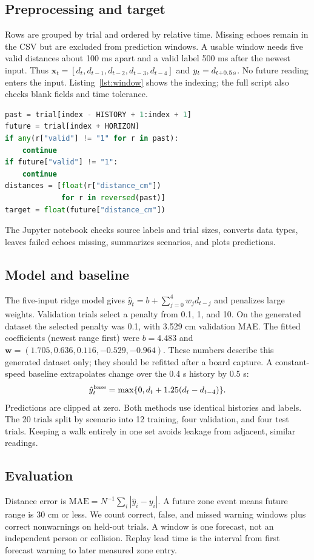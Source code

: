 \documentclass[conference]{IEEEtran}
\begin{document}
\subsection{Preprocessing and target}
Rows are grouped by trial and ordered by relative time. Missing echoes remain in the CSV but are excluded from prediction windows. A usable window needs five valid distances about 100 ms apart and a valid label 500 ms after the newest input. Thus $\mathbf{x}_t=[d_t,d_{t-1},d_{t-2},d_{t-3},d_{t-4}]$ and $y_t=d_{t+0.5\,{\rm s}}$. No future reading enters the input. Listing~\ref{lst:window} shows the indexing; the full script also checks blank fields and time tolerance.
\begin{lstlisting}[language=Python,caption={Condensed history construction from train_model.py.},label={lst:window}]
past = trial[index - HISTORY + 1:index + 1]
future = trial[index + HORIZON]
if any(r["valid"] != "1" for r in past):
    continue
if future["valid"] != "1":
    continue
distances = [float(r["distance_cm"])
             for r in reversed(past)]
target = float(future["distance_cm"])
\end{lstlisting}
The Jupyter notebook checks source labels and trial sizes, converts data types, leaves failed echoes missing, summarizes scenarios, and plots predictions.
\subsection{Model and baseline}
The five-input ridge model gives $\hat y_t=b+\sum_{j=0}^{4}w_jd_{t-j}$ and penalizes large weights. Validation trials select a penalty from 0.1, 1, and 10. On the generated dataset the selected penalty was 0.1, with 3.529 cm validation MAE. The fitted coefficients (newest range first) were $b=4.483$ and $\mathbf{w}=(1.705,0.636,0.116,-0.529,-0.964)$. These numbers describe this generated dataset only; they should be refitted after a board capture. A constant-speed baseline extrapolates change over the 0.4 s history by 0.5 s:
\begin{equation}\hat y_t^{\rm base}=\max\{0,d_t+1.25(d_t-d_{t-4})\}.\end{equation}
Predictions are clipped at zero. Both methods use identical histories and labels. The 20 trials split by scenario into 12 training, four validation, and four test trials. Keeping a walk entirely in one set avoids leakage from adjacent, similar readings.
\subsection{Evaluation}
Distance error is $\mathrm{MAE}=N^{-1}\sum_i|\hat y_i-y_i|$. A future zone event means future range is 30 cm or less. We count correct, false, and missed warning windows plus correct nonwarnings on held-out trials. A window is one forecast, not an independent person or collision. Replay lead time is the interval from first forecast warning to later measured zone entry.
\end{document}
